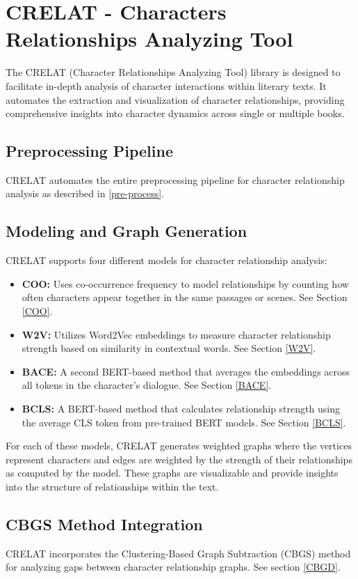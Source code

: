\documentclass[a4paper,12pt]{report}
\begin{document}
\section{CRELAT - Characters Relationships Analyzing Tool}

The CRELAT (Character Relationships Analyzing Tool) library is designed to facilitate in-depth analysis of character interactions within literary texts. It automates the extraction and visualization of character relationships, providing comprehensive insights into character dynamics across single or multiple books.

\subsection{Preprocessing Pipeline}
CRELAT automates the entire preprocessing pipeline for character relationship analysis as described in \ref{pre-process}.

\subsection{Modeling and Graph Generation}
CRELAT supports four different models for character relationship analysis:
\begin{itemize}
    \item \textbf{COO:} Uses co-occurrence frequency to model relationships by counting how often characters appear together in the same passages or scenes. See Section \ref{COO}.
    \item \textbf{W2V:} Utilizes Word2Vec embeddings to measure character relationship strength based on similarity in contextual words. See Section \ref{W2V}.
    \item \textbf{BACE:} A second BERT-based method that averages the embeddings across all tokens in the character's dialogue. See Section \ref{BACE}.
    \item \textbf{BCLS:} A BERT-based method that calculates relationship strength using the average CLS token from pre-trained BERT models. See Section \ref{BCLS}.

\end{itemize}

For each of these models, CRELAT generates weighted graphs where the vertices represent characters and edges are weighted by the strength of their relationships as computed by the model. These graphs are visualizable and provide insights into the structure of relationships within the text.

\subsection{CBGS Method Integration}
\label{CBGS}
CRELAT incorporates the Clustering-Based Graph Subtraction (CBGS) method for analyzing gaps between character relationship graphs. See section \ref{CBGD}.
\end{document}
